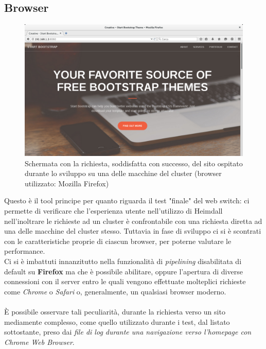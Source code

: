 \documentclass[italian]{tktltiki2}
\begin{document}
\subsection{Browser}
\begin{figure}[h]
\centering
\includegraphics[width=\textwidth]{images/screen_browser}
\caption{Schermata con la richiesta, soddisfatta con successo, del sito ospitato durante lo sviluppo su una delle macchine del cluster (browser utilizzato: Mozilla Firefox)}
\end{figure}
Questo è il tool principe per quanto riguarda il test "finale" del web switch: ci permette di verificare che l'esperienza utente nell'utilizzo di Heimdall nell'inoltrare le richieste ad un cluster è confrontabile con una richiesta diretta ad una delle macchine del cluster stesso. Tuttavia in fase di sviluppo ci si è scontrati con le caratteristiche proprie di ciascun browser, per poterne valutare le performance. \\
Ci si è imbattuti innanzitutto nella funzionalità di \emph{pipelining} disabilitata di default su \textbf{Firefox}\cite{firefox} ma che è possibile abilitare, oppure l'apertura di diverse connessioni con il server entro le quali vengono effettuate molteplici richieste come \emph{Chrome}\cite{chrome} o \emph{Safari}\cite{apple} o, generalmente, un qualsiasi browser moderno. \\\\
È possibile osservare tali peculiarità, durante la richiesta verso un sito mediamente complesso, come quello utilizzato durante i test, dal listato sottostante, preso dai \emph{file di log durante una navigazione verso l'homepage con Chrome Web Browser}.
\end{document}
